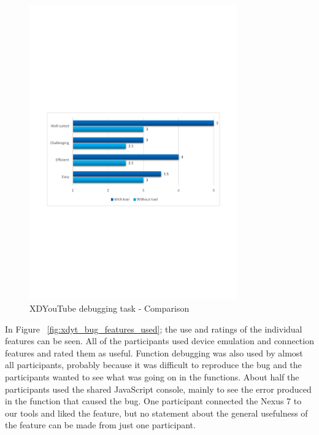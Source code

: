 \begin{figure}[H]
  \centering
    \includegraphics[width=0.8\textwidth]{images/charts/xdyt_bug_comparison.pdf}
	\caption{XDYouTube debugging task - Comparison}
	\label{fig:xdyt_bug_comparison}
\end{figure}

In Figure ~\ref{fig:xdyt_bug_features_used}; the use and ratings of the individual features can be seen. All of the participants used device emulation and connection features and rated them as useful. Function debugging was also used by almost all participants, probably because it was difficult to reproduce the bug and the participants wanted to see what was going on in the functions. About half the participants used the shared JavaScript console, mainly to see the error produced in the function that caused the bug. One participant connected the Nexus 7 to our tools and liked the feature, but no statement about the general usefulness of the feature can be made from just one participant. 

